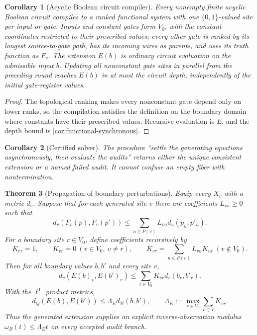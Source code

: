 \documentclass[11pt]{article}
\newtheorem{theorem}{Theorem}[section]
\newtheorem{corollary}[theorem]{Corollary}
\theoremstyle{definition}
\theoremstyle{remark}
\numberwithin{equation}{section}
\newcommand{\cB}{\mathcal B}
\begin{document}
\begin{corollary}[Acyclic Boolean circuit compiler]
\label{cor:boolean-circuit-compiler}
Every nonempty finite acyclic Boolean circuit compiles to a ranked functional
system with one $\{0,1\}$-valued site per input or gate.  Inputs and constant
gates form $V_0$, with the constant coordinates restricted to their prescribed
values; every other gate is ranked by its longest source-to-gate path, has its
incoming wires as parents, and uses its truth function as $F_v$.  The
extension $E(b)$ is ordinary circuit evaluation on the admissible input
$b$.  Updating all nonconstant gate sites in parallel from the preceding
round reaches $E(b)$ in at most the circuit depth, independently of the
initial gate-register values.
\end{corollary}

\begin{proof}
The topological ranking makes every nonconstant gate depend only on lower
ranks, so the compilation satisfies the definition on the boundary domain
where constants have their prescribed values.  Recursive evaluation is $E$,
and the depth bound is \cref{cor:functional-synchronous}.
\end{proof}

\begin{corollary}[Certified solver]
The procedure ``settle the generating equations asynchronously, then evaluate the audits'' returns either the unique consistent extension or a named failed audit.  It cannot confuse an empty fiber with nontermination.
\end{corollary}

\begin{theorem}[Propagation of boundary perturbations]\label{thm:functional-lipschitz}
Equip every $X_v$ with a metric $d_v$.  Suppose that for each generated site $v$ there are coefficients $L_{vu}\ge0$ such that
\[
 d_v(F_v(p),F_v(p'))
 \le
 \sum_{u\in P(v)}L_{vu}d_u(p_u,p'_u).
\]
For a boundary site $r\in V_0$, define coefficients recursively by
\[
 K_{rr}=1,
 \qquad K_{vr}=0\ (v\in V_0,\ v\ne r),
 \qquad
 K_{vr}=\sum_{u\in P(v)}L_{vu}K_{ur}\ (v\notin V_0).
\]
Then for all boundary values $b,b'$ and every site $v$,
\[
 d_v(E(b)_v,E(b')_v)
 \le
 \sum_{r\in V_0}K_{vr}d_r(b_r,b'_r).
\]
With the $\ell^1$ product metrics,
\[
 d_Q(E(b),E(b'))
 \le
 \Lambda_E d_{\cB}(b,b'),
 \qquad
 \Lambda_E:=\max_{r\in V_0}\sum_{v\in V}K_{vr}.
\]
Thus the generated extension supplies an explicit inverse-observation modulus
$\omega_B(t)\le\Lambda_Et$ on every accepted audit branch.
\end{theorem}
\end{document}
